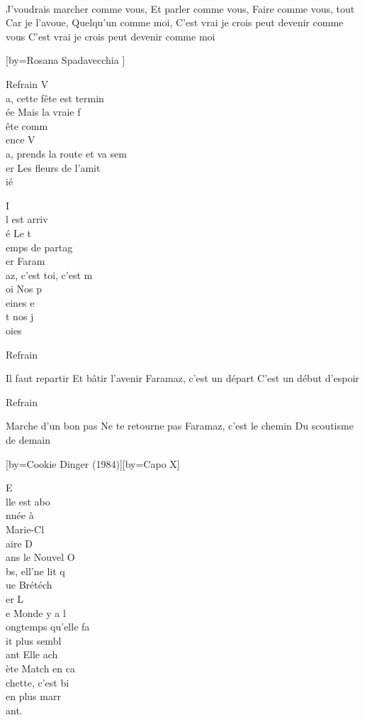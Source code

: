 \\[Scat]

\beginverse
J'voudrais marcher comme vous,
Et parler comme vous,
Faire comme vous, tout \!
Car je l'avoue,
Quelqu'un comme moi,
C'est vrai je crois peut devenir comme vous \!
C'est vrai je crois peut devenir comme moi \! \\[bis]
\endverse

[by={Rosana Spadavecchia }]

\beginverse
Refrain
V\\[Lam]a, cette fête est termin\\[Rém]ée
Mais la vraie f\\[Sol7]ête comm\\[Do]ence
V\\[Lam]a, prends la route et va sem\\[Mi]er
Les fleurs de l'amit\\[Lam]ié
\endverse

\beginverse
I\\[Mi]l est arriv\\[Lam]é
Le t\\[Sol]emps de partag\\[Do]er
Faram\\[Rém]az, c'est toi, c'est m\\[Do]oi
Nos p\\[Lam]eines e\\[Rém]t nos j\\[Mi]oies
\endverse

\beginverse
Refrain
\endverse

\beginverse
Il faut repartir
Et bâtir l'avenir
Faramaz, c'est un départ
C'est un début d'espoir
\endverse

\beginverse
Refrain
\endverse

\beginverse
Marche d'un bon pas
Ne te retourne pas
Faramaz, c'est le chemin
Du scoutisme de demain
\endverse

[by={Cookie Dinger (1984)}][by={Capo X}]

\beginverse
E\\[Lam]lle est abo\\[Fa]nnée à\\[Do] Marie-Cl\\[Sol]aire
D\\[LAm]ans le Nouvel O\\[Fa]bs, ell'ne lit q\\[Do]ue Brétéch\\[Sol]er
L\\[Lam]e Monde y a l\\[Fa]ongtemps qu'elle fa\\[Do]it plus sembl\\[Sol]ant
Elle ach\\[Lam]ète Match en ca\\[Fa]chette, c'est bi\\[Do]en plus marr\\[Sol7]ant.
\endverse

